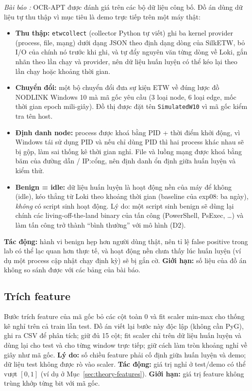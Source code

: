 \textit{Bài báo \cite{aly2025ocrapt}:} OCR-APT được đánh giá trên các bộ dữ liệu công bố. Đồ án dùng dữ liệu tự thu thập vì mục tiêu là demo trực tiếp trên một máy thật:
\begin{itemize}
    \item \textbf{Thu thập:} \texttt{etwcollect} (collector Python tự viết) ghi ba kernel provider (process, file, mạng) dưới dạng JSON theo định dạng dòng của SilkETW, bỏ I/O của chính nó trước khi ghi, và tự đẩy nguyên văn từng dòng về Loki, gắn nhãn theo lần chạy và provider, nên dữ liệu huấn luyện có thể kéo lại theo lần chạy hoặc khoảng thời gian.
    \item \textbf{Chuyển đổi:} một bộ chuyển đổi đưa sự kiện ETW về đúng lược đồ NODLINK Windows 10 mà mã gốc yêu cầu (3 loại node, 6 loại edge, mốc thời gian epoch mili-giây). Đồ thị được đặt tên \texttt{SimulatedW10} vì mã gốc kiểm tra tên host.
    \item \textbf{Định danh node:} process được khoá bằng PID + thời điểm khởi động, vì Windows tái sử dụng PID và nếu chỉ dùng PID thì hai process khác nhau sẽ bị gộp, làm sai thống kê thời gian nghỉ. File và luồng mạng được khoá bằng băm của đường dẫn / IP:cổng, nên định danh ổn định giữa huấn luyện và kiểm thử.
    \item \textbf{Benign = idle:} dữ liệu huấn luyện là hoạt động nền của máy để không (idle), kéo thẳng từ Loki theo khoảng thời gian (baseline của exp08: ba ngày), \emph{không} có script sinh hoạt động. Lý do: một script sinh benign sẽ dùng lại chính các living-off-the-land binary của tấn công (PowerShell, PsExec, \ldots) và làm tấn công trở thành ``bình thường'' với mô hình (D2).
\end{itemize}
\textbf{Tác động:} hành vi benign hẹp hơn người dùng thật, nên tỉ lệ false positive trong lab có thể lạc quan hơn thực tế, và hoạt động nền chưa thấy lúc huấn luyện (ví dụ một process cập nhật chạy định kỳ) sẽ bị gắn cờ. \textbf{Giới hạn:} số liệu của đồ án không so sánh được với các bảng của bài báo.

\subsection{Trích feature}
\label{sec:dev-features}

Bước trích feature của mã gốc \cite{ocrapt_repo} bỏ các cột toàn 0 và fit scaler min-max cho thống kê nghỉ trên cả train lẫn test. Đồ án viết lại bước này độc lập (không cần PyG), ghi ra CSV để phân tích; giữ đủ 15 cột; fit scaler chỉ trên dữ liệu huấn luyện và dùng lại cho test và cho từng window trực tiếp; giữ cách làm tròn khoảng nghỉ về giây như mã gốc. \textbf{Lý do:} số chiều feature phải cố định giữa huấn luyện và demo; dữ liệu test không được rò vào scaler. \textbf{Tác động:} giá trị nghỉ ở test/demo có thể vượt $[0, 1]$ (ví dụ ở Mục~\ref{sec:theory-features}). \textbf{Giới hạn:} giá trị feature không trùng khớp từng bit với mã gốc.

